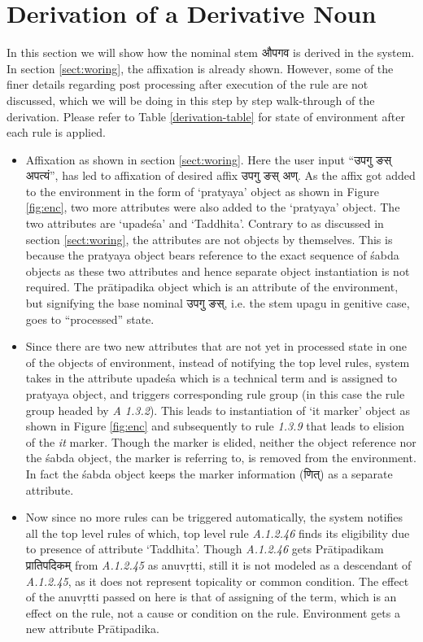 \documentclass[11pt]{article}
\begin{document}
\section{Derivation of a Derivative Noun}
\label{sect:egderi}
In this section we will show how the nominal stem {\skt औपगव} is derived in the system.
In section \ref{sect:woring}, the affixation is already shown. However, some of the finer details regarding post processing after execution of the rule are not discussed, which we will be doing in this step by step walk-through of the derivation. Please refer to Table \ref{derivation-table} for state of environment after each rule is applied.
\begin{itemize}
\item  Affixation as shown in section \ref{sect:woring}. Here the user input ``{\skt उपगु ङस् अपत्यं}'', has led to affixation of desired affix {\skt उपगु ङस् अण्}. As the affix got added to the environment in the form of `pratyaya' object as shown in Figure \ref{fig:enc}, two more attributes were also added to the `pratyaya' object. The two attributes are `upadeśa' and `Taddhita'. Contrary to as discussed in section \ref{sect:woring}, the attributes are not objects by themselves. This is because the pratyaya object bears reference to the exact sequence of śabda objects as these two attributes and hence separate object instantiation is not required. The prātipadika object which is an attribute of the environment, but signifying the base nominal {\skt उपगु ङस्}, i.e. the stem upagu in genitive case, goes to ``processed'' state. 

\item Since there are two new attributes that are not yet in processed state in one of the objects of environment, instead of notifying the top level rules, system takes in the attribute upadeśa which is a technical term and is assigned to pratyaya object, and triggers corresponding rule group (in this case the rule group headed by {\sl A 1.3.2}). This leads to instantiation of `it marker' object as shown in Figure \ref{fig:enc} and subsequently to rule {\sl 1.3.9} that leads to elision of the {\sl it} marker. Though the marker is elided, neither the object reference nor the śabda object, the marker is referring to, is removed from the environment. In fact the śabda object keeps the marker information ({\skt णित्}) as a separate attribute.

\item Now since no more rules can be triggered automatically, the system notifies all the top level rules of which, top level rule {\sl A.1.2.46} finds its eligibility due to presence of attribute `Taddhita'. Though {\sl A.1.2.46} gets Prātipadikam { \skt प्रातिपदिकम्  } from {\sl A.1.2.45} as anuvṛtti, still it is not modeled as a descendant of {\sl A.1.2.45}, as it does not represent topicality or common condition. The effect of the anuvṛtti passed on here is that of assigning of the term, which is an effect on the rule, not a cause or condition on the rule. Environment gets a new attribute Prātipadika.


\end{itemize}
\end{document}
